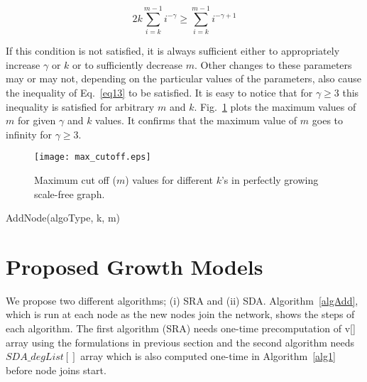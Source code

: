 \documentclass[10pt,journal,cspaper,compsoc]{IEEEtran}
\begin{document}
\begin{equation}
\label{eq13}
2k\sum_{i=k}^{m-1}i^{-\gamma} \geq \sum_{i=k}^{m-1}i^{-\gamma+1}
\end{equation}

If this condition is not satisfied, it is always sufficient either to appropriately increase $\gamma$ or $k$ or to sufficiently decrease $m$. Other changes to these parameters may or may not, depending on the particular values of the parameters, also cause the inequality of Eq.~\ref{eq13} to be satisfied. It is easy to notice that for $\gamma\geq 3$ this inequality is satisfied for arbitrary $m$ and $k$. Fig.~\ref{fig:maxm} plots the maximum values of $m$ for given $\gamma$ and $k$ values. It confirms that the maximum value of $m$ goes to infinity for $\gamma\geq 3$.

\begin{figure}
\centering
\texttt{[image: max\_cutoff.eps]}
\caption{Maximum cut off ($m$) values for different $k$'s in perfectly growing scale-free graph.}
\label{fig:maxm}
\end{figure}

\begin{algorithm}
    \caption{AddNode(algoType, k, m)}
    \label{algAdd}
    \begin{algorithmic}[1]
    \STATE{Pick a random number $r$ in [0,1)}
    \ENDWHILE
    \ENDIF
    \end{algorithmic}
\end{algorithm}


\section{Proposed Growth Models}
\label{sec:proposed}
We propose two different algorithms; (i) SRA and (ii) SDA. Algorithm~\ref{algAdd}, which is run at each node as the new nodes join the network, shows the steps of each algorithm. The first algorithm (SRA) needs one-time precomputation of v[] array using the formulations in previous section and the second algorithm needs $SDA\_degList[]$ array which is also computed one-time in Algorithm~\ref{alg1} before node joins start.
\end{document}
